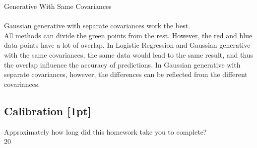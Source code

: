 \documentclass[submit]{harvardml}
\begin{document}
Generative With Same Covariances\\
\\
Gaussian generative with separate covariances work the best.\\ 
All methods can divide the green points from the rest. However, the red and blue data points have a lot of overlap. In Logistic Regression and Gaussian generative with the same covariances, the same data would lead to the same result, and  thus the overlap influence the accuracy of predictions. In Gaussian generative with separate covariances, however, the differences can be reflected from the different covariances.  






\newpage
\subsection*{Calibration [1pt]}
Approximately how long did this homework take you to complete?\\
20
\end{document}

